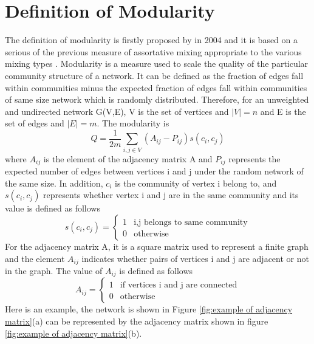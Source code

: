 \documentclass[12pt,oneside,final]{vlsithesis}
\begin{document}
\section{Definition of Modularity}
The definition of modularity is firstly proposed by \citet{newman2004finding} in 2004 and it is based on a serious of the previous measure of assortative mixing appropriate to the various mixing types \cite{newman2003mixing}. Modularity is a measure used to scale the quality of the particular community structure of a network. It can be defined as the fraction of edges fall within communities minus the expected fraction of edges fall within communities of same size network which is randomly distributed. Therefore, for an unweighted and undirected network G(V,E), V is the set of vertices and $|V| = n$ and E is the set of edges and $|E| = m$. The modularity is
\begin{equation}
Q = \frac{1}{2m}\sum_{i,j \in V}(A_{ij} - P_{ij})s(c_{i}, c_{j})
\end{equation}
where $A_{ij}$ is the element of the adjacency matrix A and $P_{ij}$ represents the expected number of edges between vertices i and j under the random network of the same size. In addition, $c_{i}$ is the community of vertex i belong to, and $s(c_{i}, c_{j})$ represents whether vertex i and j are in the same community and  its value is defined as follows
\begin{equation}
s(c_{i}, c_{j}) = \begin{cases}
1 & \mbox{i,j belongs to same community} \\ 
0 & \mbox{otherwise}
\end{cases}
\end{equation}
For the adjacency matrix A, it is a square matrix used to represent a finite graph and the element $A_{ij} $ indicates whether pairs of vertices i and j are adjacent or not in the graph. The value of $A_{ij} $ is defined as follows 
\begin{equation}
A_{ij} = \begin{cases}
1 & \mbox{if vertices i and j are connected} \\
0 & \mbox{otherwise}
\end{cases}
\end{equation}
Here is an example, the network is shown in Figure \ref{fig:example of adjacency matrix}(a) can be represented by the adjacency matrix shown in figure \ref{fig:example of adjacency matrix}(b). 
\end{document}
